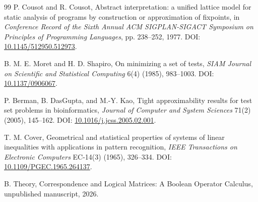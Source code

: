 \documentclass[11pt]{article}
\theoremstyle{definition}
\theoremstyle{remark}
\begin{document}
\begin{thebibliography}{99}
P. Cousot and R. Cousot,
\newblock Abstract interpretation: a unified lattice model for static analysis of programs by construction or approximation of fixpoints,
\newblock in \emph{Conference Record of the Sixth Annual ACM SIGPLAN-SIGACT Symposium on Principles of Programming Languages}, pp. 238--252, 1977.
\newblock DOI: \href{https://doi.org/10.1145/512950.512973}{10.1145/512950.512973}.

B. M. E. Moret and H. D. Shapiro,
\newblock On minimizing a set of tests,
\newblock \emph{SIAM Journal on Scientific and Statistical Computing} 6(4) (1985), 983--1003.
\newblock DOI: \href{https://doi.org/10.1137/0906067}{10.1137/0906067}.

P. Berman, B. DasGupta, and M.-Y. Kao,
\newblock Tight approximability results for test set problems in bioinformatics,
\newblock \emph{Journal of Computer and System Sciences} 71(2) (2005), 145--162.
\newblock DOI: \href{https://doi.org/10.1016/j.jcss.2005.02.001}{10.1016/j.jcss.2005.02.001}.

T. M. Cover,
\newblock Geometrical and statistical properties of systems of linear inequalities with applications in pattern recognition,
\newblock \emph{IEEE Transactions on Electronic Computers} EC-14(3) (1965), 326--334.
\newblock DOI: \href{https://doi.org/10.1109/PGEC.1965.264137}{10.1109/PGEC.1965.264137}.

B. Theory,
\newblock Correspondence and Logical Matrices: A Boolean Operator Calculus,
\newblock unpublished manuscript, 2026.

\end{thebibliography}
\end{document}
